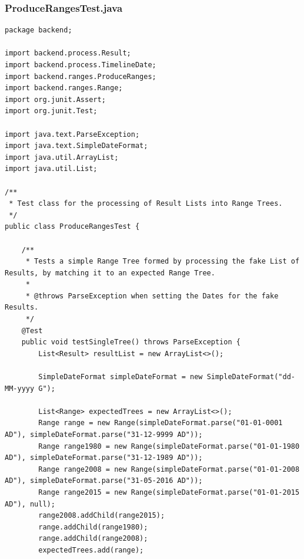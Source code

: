 \subsubsection{ProduceRangesTest.java}
\begin{lstlisting}
package backend;

import backend.process.Result;
import backend.process.TimelineDate;
import backend.ranges.ProduceRanges;
import backend.ranges.Range;
import org.junit.Assert;
import org.junit.Test;

import java.text.ParseException;
import java.text.SimpleDateFormat;
import java.util.ArrayList;
import java.util.List;

/**
 * Test class for the processing of Result Lists into Range Trees.
 */
public class ProduceRangesTest {

    /**
     * Tests a simple Range Tree formed by processing the fake List of Results, by matching it to an expected Range Tree.
     *
     * @throws ParseException when setting the Dates for the fake Results.
     */
    @Test
    public void testSingleTree() throws ParseException {
        List<Result> resultList = new ArrayList<>();

        SimpleDateFormat simpleDateFormat = new SimpleDateFormat("dd-MM-yyyy G");

        List<Range> expectedTrees = new ArrayList<>();
        Range range = new Range(simpleDateFormat.parse("01-01-0001 AD"), simpleDateFormat.parse("31-12-9999 AD"));
        Range range1980 = new Range(simpleDateFormat.parse("01-01-1980 AD"), simpleDateFormat.parse("31-12-1989 AD"));
        Range range2008 = new Range(simpleDateFormat.parse("01-01-2008 AD"), simpleDateFormat.parse("31-05-2016 AD"));
        Range range2015 = new Range(simpleDateFormat.parse("01-01-2015 AD"), null);
        range2008.addChild(range2015);
        range.addChild(range1980);
        range.addChild(range2008);
        expectedTrees.add(range);


\end{lstlisting}
